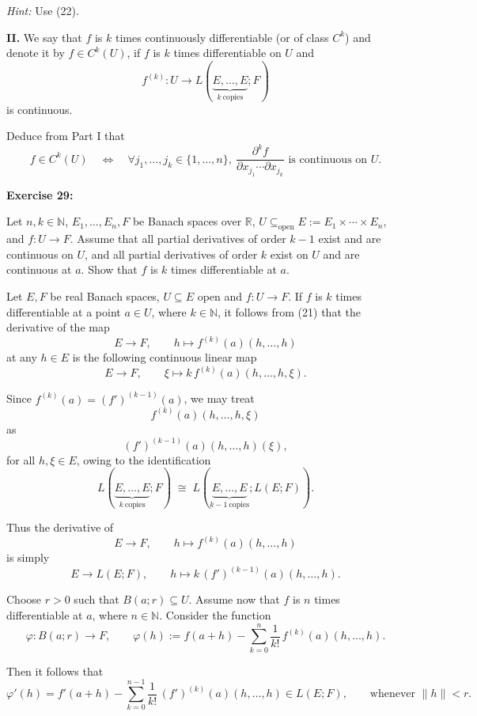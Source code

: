 \documentclass{book}
\begin{document}
\medskip
\emph{Hint:} Use (22).

\medskip

\textbf{II.} We say that $f$ is $k$ times continuously differentiable (or of class $C^k$)
and denote it by $f \in C^k(U)$, if $f$ is $k$ times differentiable on $U$ and
\[
f^{(k)} : U \to L(\underbrace{E,\dots,E}_{k\ \text{copies}};F)
\]
is continuous.

Deduce from Part I that
\[
f \in C^k(U)
\quad\Longleftrightarrow\quad
\forall j_1,\dots,j_k \in \{1,\dots,n\},\ 
\frac{\partial^k f}{\partial x_{j_1}\cdots\partial x_{j_k}}
\text{ is continuous on } U.
\]

\textbf{Exercise 29:}

Let $n,k \in \mathbb{N}$, $E_1,\dots,E_n,F$ be Banach spaces over $\mathbb{R}$,
$U \subseteq_{\mathrm{open}} E := E_1 \times \cdots \times E_n$, and
$f : U \to F$. Assume that all partial derivatives of order $k-1$ exist
and are continuous on $U$, and all partial derivatives of order $k$ exist
on $U$ and are continuous at $a$. Show that $f$ is $k$ times differentiable at $a$.

\bigskip

Let $E,F$ be real Banach spaces, $U \subseteq E$ open and $f : U \to F$.
If $f$ is $k$ times differentiable at a point $a \in U$, where $k \in \mathbb{N}$,
it follows from (21) that the derivative of the map
\[
E \longrightarrow F, \qquad h \longmapsto f^{(k)}(a)(h,\dots,h)
\]
at any $h \in E$ is the following continuous linear map
\[
E \longrightarrow F, \qquad \xi \longmapsto k\, f^{(k)}(a)(h,\dots,h,\xi).
\]

Since $f^{(k)}(a) = (f')^{(k-1)}(a)$, we may treat
\[
f^{(k)}(a)(h,\dots,h,\xi)
\]
as
\[
(f')^{(k-1)}(a)(h,\dots,h)(\xi),
\]
for all $h,\xi \in E$, owing to the identification
\[
L(\underbrace{E,\dots,E}_{k\ \text{copies}};F)
\;\cong\;
L(\underbrace{E,\dots,E}_{k-1\ \text{copies}};L(E;F)).
\]

Thus the derivative of
\[
E \longrightarrow F, \qquad h \longmapsto f^{(k)}(a)(h,\dots,h)
\]
is simply
\[
E \longrightarrow L(E;F), \qquad
h \longmapsto k\, (f')^{(k-1)}(a)(h,\dots,h).
\]

Choose $r>0$ such that $B(a;r) \subseteq U$.
Assume now that $f$ is $n$ times differentiable at $a$, where $n \in \mathbb{N}$.
Consider the function
\[
\varphi : B(a;r) \longrightarrow F,
\qquad
\varphi(h)
:=
f(a+h)
-
\sum_{k=0}^{n}
\frac{1}{k!}\, f^{(k)}(a)(h,\dots,h).
\]

Then it follows that
\[
\varphi'(h)
=
f'(a+h)
-
\sum_{k=0}^{n-1}
\frac{1}{k!}\,(f')^{(k)}(a)(h,\dots,h)
\in L(E;F),
\qquad
\text{whenever } \|h\|<r.
\tag{24}
\]
\end{document}
